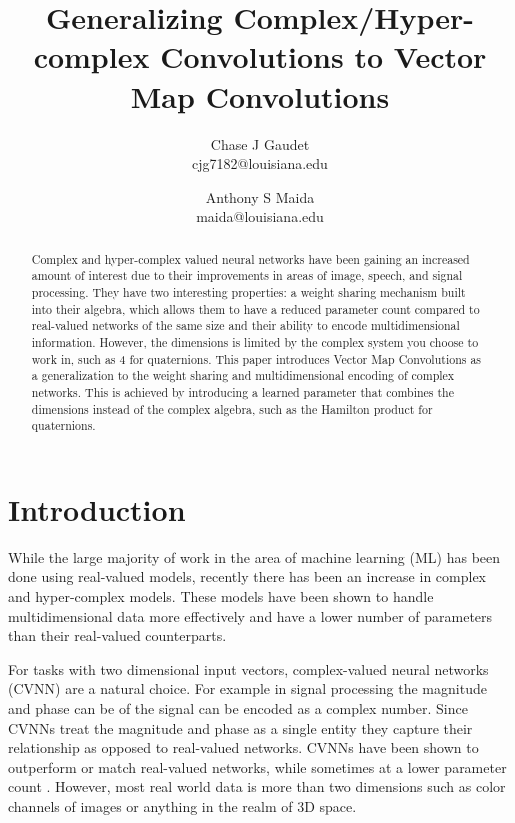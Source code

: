 \documentclass[14pt,a4paper]{article}
\begin{document}
\title{Generalizing Complex/Hyper-complex Convolutions to Vector Map Convolutions}
\author{Chase J Gaudet \\  cjg7182@louisiana.edu
   \and Anthony S Maida \\  maida@louisiana.edu}
\maketitle

\begin{abstract}
Complex and hyper-complex valued neural networks have been gaining an increased amount of interest due to their improvements in areas of image, speech, and signal processing.
They have two interesting properties: a weight sharing mechanism built into their algebra, which allows them to have a reduced parameter count compared to real-valued networks of the same size and their ability to encode multidimensional information. 
However, the dimensions is limited by the complex system you choose to work in, such as 4 for quaternions. 
This paper introduces Vector Map Convolutions as a generalization to the weight sharing and multidimensional encoding of complex networks.
This is achieved by introducing a learned parameter that combines the dimensions instead of the  complex algebra, such as the Hamilton product for quaternions.
\end{abstract}

\section{Introduction}
While the large majority of work in the area of machine learning (ML) has been done using real-valued models, recently there has been an increase in complex and hyper-complex models.
These models have been shown to handle multidimensional data more effectively and have a lower number of parameters than their real-valued counterparts.

For tasks with two dimensional input vectors, complex-valued neural networks (CVNN) are a natural choice.
For example in signal processing the magnitude and phase can be of the signal can be encoded as a complex number.
Since CVNNs treat the magnitude and phase as a single entity they capture their relationship as opposed to real-valued networks.
CVNNs have been shown to outperform or match real-valued networks, while sometimes at a lower parameter count \cite{trabelsi+al-2018-complexconv, aizenberg2018image}.
However, most real world data is more than two dimensions such as color channels of images or anything in the realm of 3D space.
\end{document}
